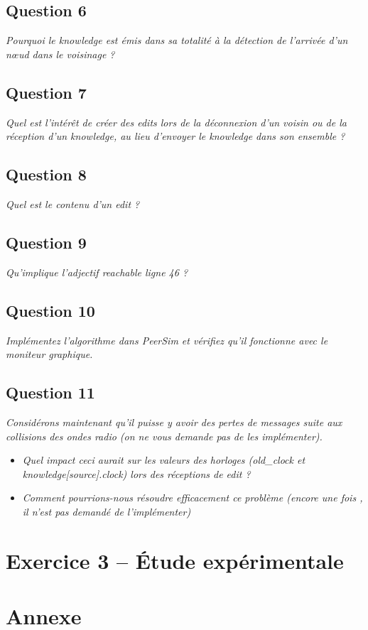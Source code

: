 \documentclass[11pt,a4paper,sans]{report}
\begin{document}
\section{Question 6}
\textit{Pourquoi le knowledge est émis dans sa totalité à la détection de l’arrivée d’un nœud dans le voisinage ?}
\section{Question 7}
\textit{Quel est l’intérêt de créer des edits lors de la déconnexion d’un voisin ou de la réception d’un knowledge, au lieu d’envoyer le knowledge dans son ensemble ?}
\section{Question 8}
\textit{Quel est le contenu d’un edit ?}
\section{Question 9}
\textit{Qu’implique l’adjectif reachable ligne 46 ?}
\section{Question 10}
\textit{Implémentez l’algorithme dans PeerSim et vérifiez qu’il fonctionne avec le moniteur graphique.}
\section{Question 11}
\textit{Considérons maintenant qu’il puisse y avoir des pertes de messages suite aux collisions des ondes radio (on ne vous demande pas de les implémenter).}
\begin{itemize}
\item \textit{Quel impact ceci aurait sur les valeurs des horloges (old\_clock et knowledge[source].clock) lors des réceptions de edit ?}
\item \textit{Comment pourrions-nous résoudre efficacement ce problème (encore une fois , il n’est pas demandé de l’implémenter)}
\end{itemize}

\newpage
\chapter{Exercice 3 – Étude expérimentale}

\newpage



\newpage
\chapter{Annexe}
\end{document}
